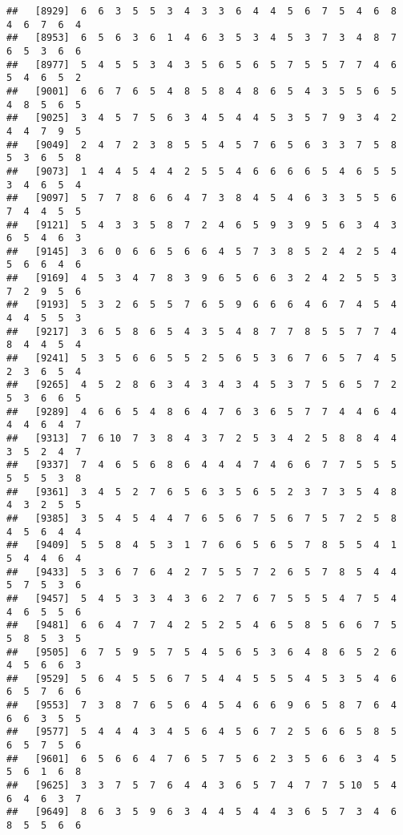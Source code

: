 \documentclass[
]{book}
\begin{document}
\begin{verbatim}
##   [8929]  6  6  3  5  5  3  4  3  3  6  4  4  5  6  7  5  4  6  8  4  6  7  6  4
##   [8953]  6  5  6  3  6  1  4  6  3  5  3  4  5  3  7  3  4  8  7  6  5  3  6  6
##   [8977]  5  4  5  5  3  4  3  5  6  5  6  5  7  5  5  7  7  4  6  5  4  6  5  2
##   [9001]  6  6  7  6  5  4  8  5  8  4  8  6  5  4  3  5  5  6  5  4  8  5  6  5
##   [9025]  3  4  5  7  5  6  3  4  5  4  4  5  3  5  7  9  3  4  2  4  4  7  9  5
##   [9049]  2  4  7  2  3  8  5  5  4  5  7  6  5  6  3  3  7  5  8  5  3  6  5  8
##   [9073]  1  4  4  5  4  4  2  5  5  4  6  6  6  6  5  4  6  5  5  3  4  6  5  4
##   [9097]  5  7  7  8  6  6  4  7  3  8  4  5  4  6  3  3  5  5  6  7  4  4  5  5
##   [9121]  5  4  3  3  5  8  7  2  4  6  5  9  3  9  5  6  3  4  3  6  5  4  6  3
##   [9145]  3  6  0  6  6  5  6  6  4  5  7  3  8  5  2  4  2  5  4  5  6  6  4  6
##   [9169]  4  5  3  4  7  8  3  9  6  5  6  6  3  2  4  2  5  5  3  7  2  9  5  6
##   [9193]  5  3  2  6  5  5  7  6  5  9  6  6  6  4  6  7  4  5  4  4  4  5  5  3
##   [9217]  3  6  5  8  6  5  4  3  5  4  8  7  7  8  5  5  7  7  4  8  4  4  5  4
##   [9241]  5  3  5  6  6  5  5  2  5  6  5  3  6  7  6  5  7  4  5  2  3  6  5  4
##   [9265]  4  5  2  8  6  3  4  3  4  3  4  5  3  7  5  6  5  7  2  5  3  6  6  5
##   [9289]  4  6  6  5  4  8  6  4  7  6  3  6  5  7  7  4  4  6  4  4  4  6  4  7
##   [9313]  7  6 10  7  3  8  4  3  7  2  5  3  4  2  5  8  8  4  4  3  5  2  4  7
##   [9337]  7  4  6  5  6  8  6  4  4  4  7  4  6  6  7  7  5  5  5  5  5  5  3  8
##   [9361]  3  4  5  2  7  6  5  6  3  5  6  5  2  3  7  3  5  4  8  4  3  2  5  5
##   [9385]  3  5  4  5  4  4  7  6  5  6  7  5  6  7  5  7  2  5  8  4  5  6  4  4
##   [9409]  5  5  8  4  5  3  1  7  6  6  5  6  5  7  8  5  5  4  1  5  4  4  6  4
##   [9433]  5  3  6  7  6  4  2  7  5  5  7  2  6  5  7  8  5  4  4  5  7  5  3  6
##   [9457]  5  4  5  3  3  4  3  6  2  7  6  7  5  5  5  4  7  5  4  4  6  5  5  6
##   [9481]  6  6  4  7  7  4  2  5  2  5  4  6  5  8  5  6  6  7  5  5  8  5  3  5
##   [9505]  6  7  5  9  5  7  5  4  5  6  5  3  6  4  8  6  5  2  6  4  5  6  6  3
##   [9529]  5  6  4  5  5  6  7  5  4  4  5  5  5  4  5  3  5  4  6  6  5  7  6  6
##   [9553]  7  3  8  7  6  5  6  4  5  4  6  6  9  6  5  8  7  6  4  6  6  3  5  5
##   [9577]  5  4  4  4  3  4  5  6  4  5  6  7  2  5  6  6  5  8  5  6  5  7  5  6
##   [9601]  6  5  6  6  4  7  6  5  7  5  6  2  3  5  6  6  3  4  5  5  6  1  6  8
##   [9625]  3  3  7  5  7  6  4  4  3  6  5  7  4  7  7  5 10  5  4  6  4  6  3  7
##   [9649]  8  6  3  5  9  6  3  4  4  5  4  4  3  6  5  7  3  4  6  8  5  5  6  6

\end{verbatim}
\end{document}

